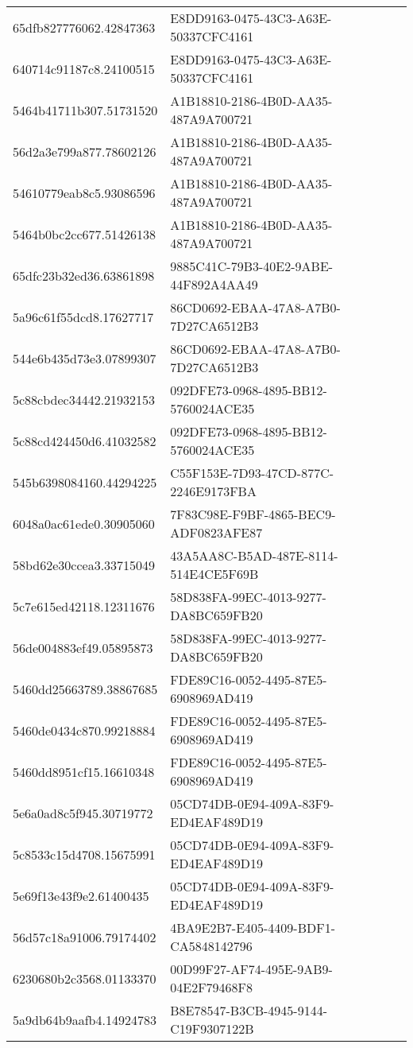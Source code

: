 \begin{tabular}{ll}
65dfb827776062.42847363 & E8DD9163-0475-43C3-A63E-50337CFC4161 \\
640714c91187c8.24100515 & E8DD9163-0475-43C3-A63E-50337CFC4161 \\
5464b41711b307.51731520 & A1B18810-2186-4B0D-AA35-487A9A700721 \\
56d2a3e799a877.78602126 & A1B18810-2186-4B0D-AA35-487A9A700721 \\
54610779eab8c5.93086596 & A1B18810-2186-4B0D-AA35-487A9A700721 \\
5464b0bc2cc677.51426138 & A1B18810-2186-4B0D-AA35-487A9A700721 \\
65dfc23b32ed36.63861898 & 9885C41C-79B3-40E2-9ABE-44F892A4AA49 \\
5a96c61f55dcd8.17627717 & 86CD0692-EBAA-47A8-A7B0-7D27CA6512B3 \\
544e6b435d73e3.07899307 & 86CD0692-EBAA-47A8-A7B0-7D27CA6512B3 \\
5c88cbdec34442.21932153 & 092DFE73-0968-4895-BB12-5760024ACE35 \\
5c88cd424450d6.41032582 & 092DFE73-0968-4895-BB12-5760024ACE35 \\
545b6398084160.44294225 & C55F153E-7D93-47CD-877C-2246E9173FBA \\
6048a0ac61ede0.30905060 & 7F83C98E-F9BF-4865-BEC9-ADF0823AFE87 \\
58bd62e30ccea3.33715049 & 43A5AA8C-B5AD-487E-8114-514E4CE5F69B \\
5c7e615ed42118.12311676 & 58D838FA-99EC-4013-9277-DA8BC659FB20 \\
56de004883ef49.05895873 & 58D838FA-99EC-4013-9277-DA8BC659FB20 \\
5460dd25663789.38867685 & FDE89C16-0052-4495-87E5-6908969AD419 \\
5460de0434c870.99218884 & FDE89C16-0052-4495-87E5-6908969AD419 \\
5460dd8951cf15.16610348 & FDE89C16-0052-4495-87E5-6908969AD419 \\
5e6a0ad8c5f945.30719772 & 05CD74DB-0E94-409A-83F9-ED4EAF489D19 \\
5c8533c15d4708.15675991 & 05CD74DB-0E94-409A-83F9-ED4EAF489D19 \\
5e69f13e43f9e2.61400435 & 05CD74DB-0E94-409A-83F9-ED4EAF489D19 \\
56d57c18a91006.79174402 & 4BA9E2B7-E405-4409-BDF1-CA5848142796 \\
6230680b2c3568.01133370 & 00D99F27-AF74-495E-9AB9-04E2F79468F8 \\
5a9db64b9aafb4.14924783 & B8E78547-B3CB-4945-9144-C19F9307122B \\

\end{tabular}
